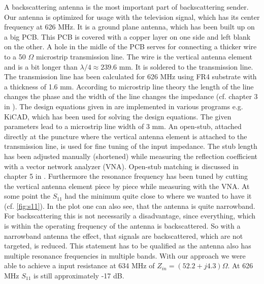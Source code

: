 \documentclass[conference]{IEEEtran}
\begin{document}
A backscattering antenna is the most important part of backscattering sender. Our antenna is optimized for usage with the television signal, which has its center frequency at 626 MHz. It is a ground plane antenna, which has been built up on a big PCB. This PCB is covered with a copper layer on one side and left blank on the other. A hole in the midle of the PCB serves for connecting a thicker wire to a 50 \ensuremath{\Omega} microstrip transmission line. The wire is the vertical antenna element and is a bit longer than \ensuremath{\lambda/4 \approx \text{239.6 mm}}. It is soldered to the transmission line. The transmission line has been calculated for 626 MHz using FR4 substrate with a thickness of 1.6 mm. According to microstrip line theory the length of the line changes the phase and the width of the line changes the impedance (cf. chapter 3 in \cite{book:pozar}). The design equations given in \cite{books:pozar} are implemented in various programs e.g. KiCAD, which has been used for solving the design equations. The given parameters lead to a microstrip line width of 3 mm. An open-stub, attached directly at the puncture where the vertical antenna element is attached to the transmission line, is used for fine tuning of the input impedance. The stub length has been adjusted manually (shortened) while measuring the reflection coefficient with a vector network analyzer (VNA). Open-stub matching is discussed in chapter 5 in \cite{book:pozar}. Furthermore the resonance frequency has been tuned by cutting the vertical antenna element piece by piece while measuring with the VNA. At some point the \ensuremath{S_{\text{11}}} had the minimum quite close to where we wanted to have it (cf. \ref{fig:s11}). In the plot one can also see, that the antenna is quite narrowband. For backscattering this is not necessarily a disadvantage, since everything, which is within the operating frequency of the antenna is backscattered. So with a narrowband antenna the effect, that signals are backscattered, which are not targeted, is reduced. This statement has to be qualified as the antenna also has multiple resonance frequencies in multiple bands. With our approach we were able to achieve a input resistance at 634 MHz of \ensuremath{Z_{in}=(52.2 + j 4.3) \Omega}. At 626 MHz \ensuremath{S_{\text{11}}} is still approximately -17 dB.                   
\end{document}
